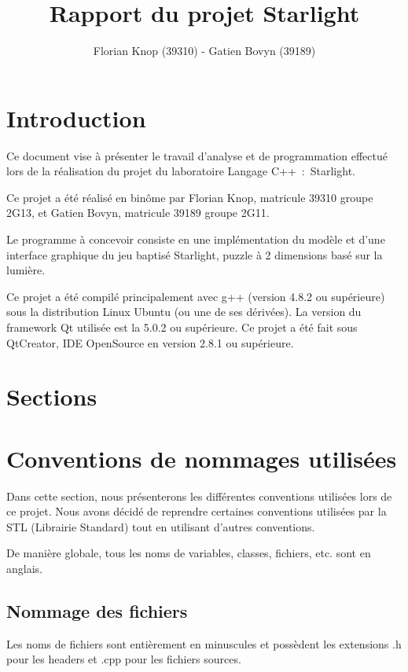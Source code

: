 \documentclass[]{article}
\title{Rapport du projet Starlight}
\author{Florian Knop (39310) - Gatien Bovyn (39189)}
\begin{document}
\maketitle

\newpage

\tableofcontents

\newpage

\section{Introduction}


Ce document vise à présenter le travail d’analyse et de programmation effectué
lors de la réalisation du projet du laboratoire Langage C++~:~Starlight.

Ce projet a été réalisé en binôme par Florian Knop, matricule 39310 groupe 2G13,
et Gatien Bovyn, matricule 39189 groupe 2G11.

Le programme à concevoir consiste en une implémentation du modèle et d’une interface
graphique du jeu baptisé Starlight, puzzle à 2 dimensions basé sur la lumière.

Ce projet a été compilé principalement avec g++
(version 4.8.2 ou supérieure)
sous la distribution Linux Ubuntu (ou une de ses dérivées).
La version du framework Qt utilisée est la 5.0.2 ou supérieure.
Ce projet a été fait sous QtCreator, IDE OpenSource en version 2.8.1 ou
supérieure.

\section{Sections}

\section{Conventions de nommages utilisées}

Dans cette section, nous présenterons les différentes conventions 
utilisées lors de ce projet. Nous avons décidé de reprendre certaines
conventions utilisées par la STL (Librairie Standard)
tout en utilisant d'autres conventions.

De manière globale, tous les noms de variables, classes, fichiers, etc.
sont en anglais.

\subsection{Nommage des fichiers}

Les noms de fichiers sont entièrement en minuscules
et possèdent les extensions .h
pour les headers et .cpp pour les fichiers sources.
\end{document}
